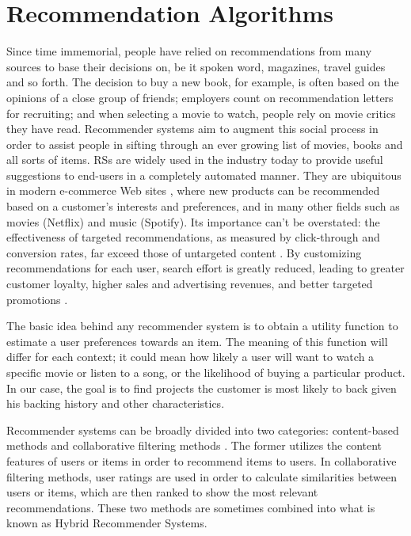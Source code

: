 \documentclass[cic,tc,english]{iiufrgs}
\begin{document}
\chapter{Recommendation Algorithms}
Since time immemorial, people have relied on recommendations from many sources to base their decisions on, be it spoken word, magazines, travel guides and so forth. The decision to buy a new book, for example, is often based on the opinions of a close group of friends; employers count on recommendation letters for recruiting; and when selecting a movie to watch, people rely on movie critics they have read. Recommender systems aim to augment this social process in order to assist people in sifting through an ever growing list of movies, books and all sorts of items. RSs are widely used in the industry today to provide useful suggestions to end-users in a completely automated manner. They are ubiquitous in modern e-commerce Web sites \cite{Schafer2001}, where new products can be recommended based on a customer's interests and preferences, and in many other fields such as movies (Netflix) and music (Spotify). Its importance can't be overstated: the effectiveness of targeted recommendations, as measured by click-through and conversion rates, far exceed those of untargeted content \cite{Linden2003}. By customizing recommendations for each user, search effort is greatly reduced, leading to greater customer loyalty, higher sales and advertising revenues, and better targeted promotions \cite{Ansari2000}.

The basic idea behind any recommender system is to obtain a utility function to estimate a user preferences towards an item. The meaning of this function will differ for each context; it could mean how likely a user will want to watch a specific movie or listen to a song, or the likelihood of buying a particular product. In our case, the goal is to find projects the customer is most likely to back given his backing history and other characteristics. 

Recommender systems can be broadly divided into two categories: content-based methods and collaborative filtering methods \cite{Rakesh2016}.
The former utilizes the content features of users or items in order to recommend items to users. In collaborative filtering methods, user ratings are used in order to calculate similarities between users or items, which are then ranked to show the most relevant recommendations. These two methods are sometimes combined into what is known as Hybrid Recommender Systems.
\end{document}
